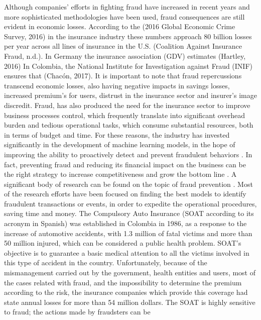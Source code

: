 \documentclass[parskip=full]{scrartcl}
\begin{document}
Although companies’ efforts in fighting fraud have increased in recent years 
and more sophisticated methodologies have been used, fraud consequences are 
still evident in economic losses. According to the (2016 Global Economic Crime 
Survey, 2016) in the insurance industry these numbers approach 80 billion 
losses per year across all lines of insurance in the U.S. (Coalition Against 
Insurance Fraud, n.d.). In Germany the insurance association (GDV) estimates 
(Hartley, 2016) In Colombia, the National Institute for Investigation against 
Fraud (INIF) ensures that (Chacón, 2017).  It is important to note that fraud 
repercussions transcend economic losses, also having negative impacts in 
savings losses, increased premium’s for users, distrust in the insurance sector 
and insurer’s image discredit. Fraud, has also produced the need for the 
insurance sector to improve business processes control, which frequently 
translate into significant overhead burden and tedious operational tasks, which 
consume substantial resources, both in terms of budget and time. 
For these reasons, the industry has invested significantly in the development 
of machine learning models, in the hope of improving the ability to proactively 
detect and prevent fraudulent behaviors \cite{Decker1998}. In fact, preventing 
fraud and reducing its financial impact on the business can be the right 
strategy to increase competitiveness and grow the bottom line \cite{Skeels 
Pan2016}. A significant body of research can be found on the topic of fraud 
prevention \cite{Phua2004} \cite{Wei2012} \cite{Banarescu2015} 
\cite{Ibrahim2015} \cite{Kim2016} \cite{Sahin2013}. Most of the research 
efforts have been focused on finding the best models to identify fraudulent 
transactions or events, in order to expedite the operational procedures, saving 
time and money.
The Compulsory Auto Insurance (SOAT according to its acronym in Spanish) was 
established in Colombia in 1986, as a response to the increase of automotive 
accidents, with 1.3 million of fatal victims and more than 50 million injured, 
which can be considered a public health problem. SOAT's objective is to 
guarantee a basic medical attention to all the victims involved in this type of 
accident in the country. Unfortunately, because of the mismanagement  carried 
out by the government, health entities and users, most of the cases  related 
with fraud, and the impossibility to determine the premium according to  the 
risk, the insurance companies which provide this coverage had state annual 
losses for more than 54 million dollars. 
The SOAT is highly sensitive to fraud; the actions made by fraudsters can be 
\end{document}
